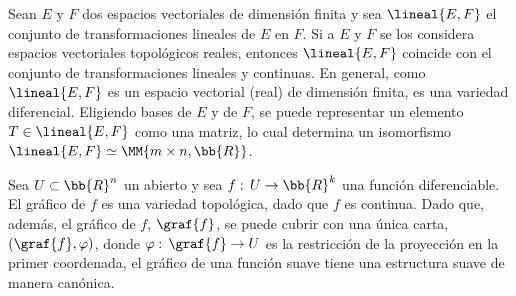 \begin{ejemplo}
	Sean $E$ y $F$ dos espacios vectoriales de dimensi\'{o}n finita
	y sea $\lineal{E,F}$ el conjunto de transformaciones lineales
	de $E$ en $F$. Si a $E$ y $F$ se los considera espacios vectoriales
	topol\'{o}gicos reales, entonces $\lineal{E,F}$ coincide con
	el conjunto de transformaciones lineales y continuas. En general,
	como $\lineal{E,F}$ es un espacio vectorial (real) de dimensi\'{o}n
	finita, es una variedad diferencial. Eligiendo bases de $E$ y de $F$,
	se puede representar un elemento $T\in\lineal{E,F}$ como una matriz,
	lo cual determina un isomorfismo
	$\lineal{E,F}\simeq\MM{m\times n,\bb{R}}$.
\end{ejemplo}

\begin{ejemplo}
	Sea $U\subset\bb{R}^{n}$ un abierto y sea $f:\,U\rightarrow\bb{R}^{k}$
	una funci\'{o}n diferenciable. El gr\'{a}fico de $f$ es una variedad
	topol\'{o}gica, dado que $f$ es continua. Dado que, adem\'{a}s, el
	gr\'{a}fico de $f$, $\graf{f}$, se puede cubrir con una \'{u}nica
	carta, $(\graf{f},\varphi)$, donde $\varphi:\,\graf{f}\rightarrow U$
	es la restricci\'{o}n de la proyecci\'{o}n en la primer coordenada,
	el gr\'{a}fico de una funci\'{o}n suave tiene una estructura suave
	de manera can\'{o}nica.
\end{ejemplo}


